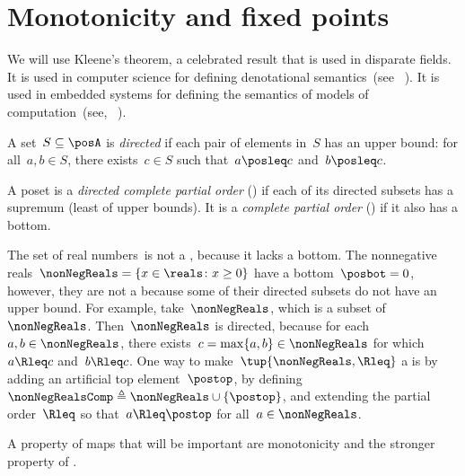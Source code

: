 

\section{Monotonicity and fixed points}
\label{sec:Monotonicity-and-fixed}

We will use Kleene's theorem, a celebrated result that is used in disparate fields.
It is used in computer science for defining denotational semantics~(see \eg~\cite{manes86}).
It is used in embedded systems for defining the semantics of models of computation~(see, \eg~\cite{lee10}).

\begin{definition}
    \label{def:directed-set}
    A set~$S\subseteq\posA$ is \emph{directed} if each pair of elements in~$S$ has an upper bound: for all~$a,b\in S$, there exists~$c\in S$ such that~$a\posleq c$ and~$b\posleq c$.
\end{definition}

\begin{definition}[Completeness]
    \label{def:cpo}A poset is a \emph{directed complete partial order} (\DCPO) if each of its directed subsets has a supremum (least of upper bounds).
    It is a \emph{complete partial order} (\CPO) if it also has a bottom.
\end{definition}

\begin{example}
    \label{exa:Rcomp}The set of real numbers~\reals is not a \CPO, because it lacks a bottom.
    The nonnegative reals~$\nonNegReals=\{x\in\reals \colon x\geq0\}$ have a bottom~$\posbot=0$, however, they are not a \DCPO because some of their directed subsets do not have an upper bound.
    For example, take~$\nonNegReals$, which is a subset of~$\nonNegReals$.
    Then~$\nonNegReals$ is directed, because for each~$a,b\in\nonNegReals$, there exists~$c=\max\{a,b\}\in\nonNegReals$ for which~$a\Rleq c$ and~$b\Rleq c$.
    One way to make~$\tup{ \nonNegReals,\Rleq} $ a \CPO is by adding an artificial top element~$\postop$, by defining~$\nonNegRealsComp\triangleq\nonNegReals\cup\{\postop\}$, and extending the partial order~$\Rleq$ so that~$a\Rleq\postop$ for all~$a\in\nonNegReals$.
\end{example}

A property of maps that will be important are monotonicity and the stronger property of \scottcontinuity.

